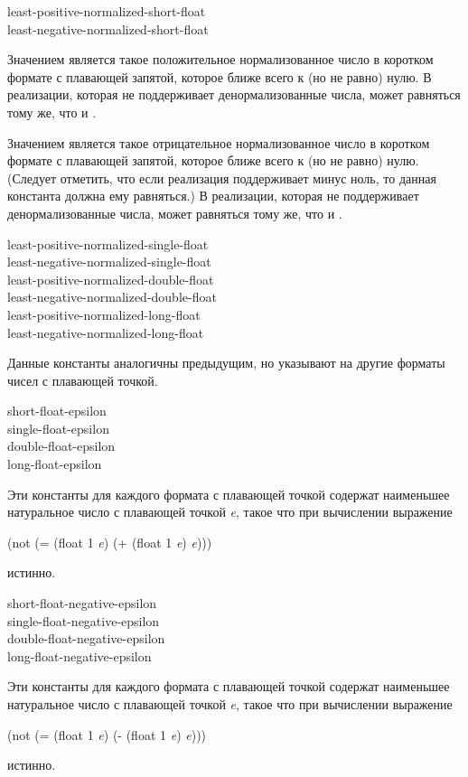 \begin{defun}[Константа]
least-positive-normalized-short-float \\
least-negative-normalized-short-float

Значением  является такое
положительное нормализованное число в коротком формате с плавающей запятой,
которое ближе всего к (но не равно) нулю. В реализации, которая не поддерживает
денормализованные числа, может равняться тому же, что и
. 

Значением  является такое
отрицательное нормализованное число в коротком формате с плавающей запятой,
которое ближе всего к (но не равно) нулю. 
(Следует отметить, что если реализация поддерживает минус ноль, то данная
константа должна ему равняться.)
В реализации, которая не поддерживает
денормализованные числа, может равняться тому же, что и
. 
\end{defun}

\begin{defun}[Константа]
least-positive-normalized-single-float \\
least-negative-normalized-single-float \\
least-positive-normalized-double-float \\
least-negative-normalized-double-float \\
least-positive-normalized-long-float \\
least-negative-normalized-long-float

Данные константы аналогичны предыдущим, но указывают на другие форматы чисел с
плавающей точкой.
\end{defun}

\begin{defun}[Константа]
short-float-epsilon \\
single-float-epsilon \\
double-float-epsilon \\
long-float-epsilon

Эти константы для каждого формата с плавающей точкой содержат наименьшее
натуральное число с плавающей точкой \emph{e}, такое что при вычислении
выражение
\begin{lisp}
(not (= (float 1 \emph{e}) (+ (float 1 \emph{e}) \emph{e})))
\end{lisp}
истинно.
\end{defun}

\begin{defun}[Константа]
short-float-negative-epsilon \\
single-float-negative-epsilon \\
double-float-negative-epsilon \\
long-float-negative-epsilon

Эти константы для каждого формата с плавающей точкой содержат наименьшее
натуральное число с плавающей точкой \emph{e}, такое что при вычислении выражение
\begin{lisp}
(not (= (float 1 \emph{e}) (- (float 1 \emph{e}) \emph{e})))
\end{lisp}
истинно.
\end{defun}

\fi

\endgroup
